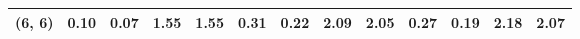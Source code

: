 \begin{tabular}{lrrrrrrrrrrrr}
(6, 6)        &                                               0.10 &                                            0.07 &                            1.55 &                                  1.55 &                                               0.31 &                                            0.22 &                            2.09 &                                  2.05 &                                               0.27 &                                            0.19 &                            2.18 &                                  2.07 \\
\bottomrule
\end{tabular}
